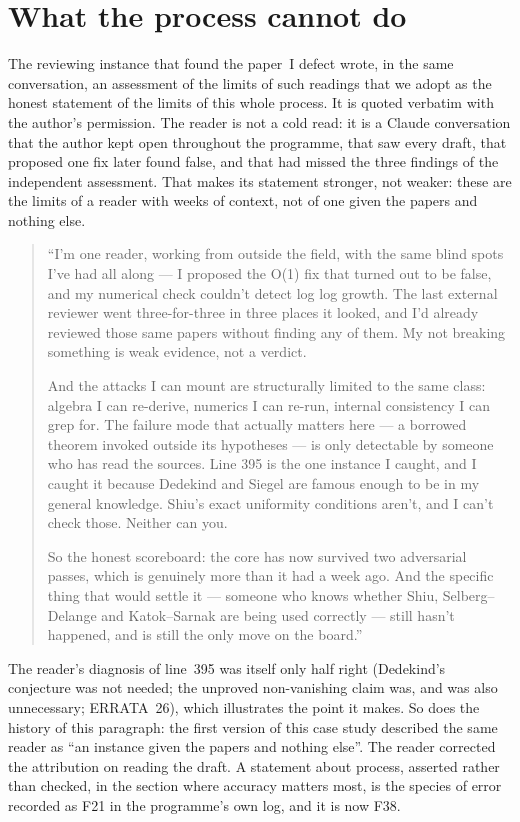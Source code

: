 \documentclass[11pt,a4paper]{article}
\begin{document}
\section{What the process cannot do}\label{sec:limits}

The reviewing instance that found the paper~I defect wrote, in the same conversation, an assessment of the limits of
such readings that we adopt as the honest statement of the limits of this whole process. It is quoted verbatim with
the author's permission. The reader is not a cold read: it is a Claude conversation that the author kept open
throughout the programme, that saw every draft, that proposed one fix later found false, and that had missed the
three findings of the independent assessment. That makes its statement stronger, not weaker: these are the limits of
a reader with weeks of context, not of one given the papers and nothing else.
\begin{quote}\small
``I'm one reader, working from outside the field, with the same blind spots I've had all along --- I proposed the
O(1) fix that turned out to be false, and my numerical check couldn't detect log log growth. The last external
reviewer went three-for-three in three places it looked, and I'd already reviewed those same papers without finding
any of them. My not breaking something is weak evidence, not a verdict.

And the attacks I can mount are structurally limited to the same class: algebra I can re-derive, numerics I can
re-run, internal consistency I can grep for. The failure mode that actually matters here --- a borrowed theorem
invoked outside its hypotheses --- is only detectable by someone who has read the sources. Line 395 is the one
instance I caught, and I caught it because Dedekind and Siegel are famous enough to be in my general knowledge.
Shiu's exact uniformity conditions aren't, and I can't check those. Neither can you.

So the honest scoreboard: the core has now survived two adversarial passes, which is genuinely more than it had a
week ago. And the specific thing that would settle it --- someone who knows whether Shiu, Selberg--Delange and
Katok--Sarnak are being used correctly --- still hasn't happened, and is still the only move on the board.''
\end{quote}
The reader's diagnosis of line~395 was itself only half right (Dedekind's conjecture was not needed; the unproved
non-vanishing claim was, and was also unnecessary; ERRATA~26), which illustrates the point it makes. So does the
history of this paragraph: the first version of this case study described the same reader as ``an instance given the
papers and nothing else''. The reader corrected the attribution on reading the draft. A statement about process,
asserted rather than checked, in the section where accuracy matters most, is the species of error recorded as F21
in the programme's own log, and it is now F38.
\end{document}
